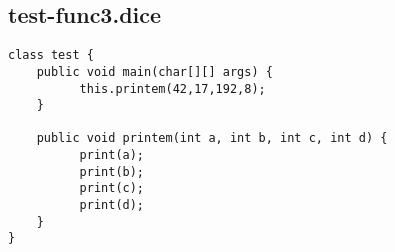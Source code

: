 \subsection{test-func3.dice}
\begin{verbatim}
class test {
	public void main(char[][] args) {
		  this.printem(42,17,192,8);
	}

	public void printem(int a, int b, int c, int d) {
		  print(a);
		  print(b);
		  print(c);
		  print(d);
	}
}

\end{verbatim}